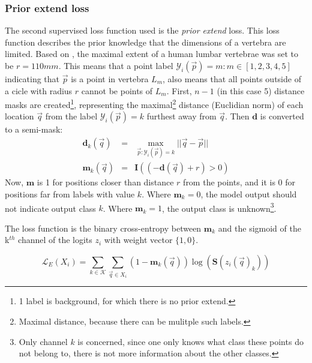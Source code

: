 \subsubsection{Prior extend loss}
The second supervised loss function used is the \textit{prior extend} loss.
This loss function describes the prior knowledge that the dimensions of a vertebra are limited. 
Based on \cite{Alam2014}, the maximal extent of a human lumbar vertebrae was set to be $r=110mm$.
This means that a point label $\mathcal{Y}_i(\vec{p})=m: m\in[1,2,3,4,5]$ indicating that $\vec{p}$ is a point in vertebra $L_m$, also means that all points outside of a cicle with radius $r$ cannot be points of $L_m$.
First, $n-1$ (in this case 5) distance masks are created\footnote{1 label is background, for which there is no prior extend.}, 
representing the maximal\footnote{Maximal distance, because there can be mulitple such labels.} distance (Euclidian norm) of each location $\vec{q}$ from the label $\mathcal{Y}_i(\vec{p})=k$ furthest away from $\vec{q}$.
Then $\mathbf{d}$ is converted to a semi-mask:
\begin{eqnarray}
    \mathbf{d}_k(\vec{q}) &=& \max_{\vec{p}:\mathcal{Y}_i(\vec{p})=k}||\vec{q} - \vec{p}||\\
    \mathbf{m}_k(\vec{q}) &=& \mathbf{I}\left( (-\mathbf{d}(\vec{q}) + r) > 0 \right)
\end{eqnarray}
Now, $\mathbf{m}$ is 1 for positions closer than distance $r$ from the points, and it is 0 for positions far from labels with value $k$.
Where $\mathbf{m}_k=0$, the model output should not indicate output class $k$. Where $\mathbf{m}_k=1$, the output class is unknown\footnote{Only channel $k$ is concerned, since one only knows what class these points do not belong to, there is not more information about the other classes.}.

The loss function is the binary cross-entropy between $\mathbf{m}_k$ and the sigmoid of the k$^{th}$ channel of the logits $z_i$ with weight vector $\{1, 0\}$.

\begin{equation}
    \mathcal{L}_E(X_i) = \sum_{k\in\mathcal{K}}\sum_{\vec{q}\in X_i}  (1-\mathbf{m}_k(\vec{q})) \log(\mathbf{S}(z_i(\vec{q})_k)) 
\end{equation}

